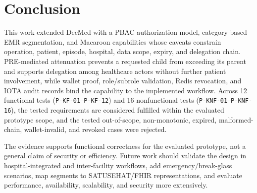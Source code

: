 \documentclass[conference,a4paper,english]{IEEEtran}
\begin{document}
\section{Conclusion}
\label{sec:conclusion}

This work extended DecMed with a PBAC authorization model, category-based EMR segmentation, and Macaroon capabilities whose caveats constrain operation, patient, episode, hospital, data scope, expiry, and delegation chain. PRE-mediated attenuation prevents a requested child from exceeding its parent and supports delegation among healthcare actors without further patient involvement, while wallet proof, role/subrole validation, Redis revocation, and IOTA audit records bind the capability to the implemented workflow. Across 12 functional tests (\texttt{P-KF-01}--\texttt{P-KF-12}) and 16 nonfunctional tests (\texttt{P-KNF-01}--\texttt{P-KNF-16}), the tested requirements are considered fulfilled within the evaluated prototype scope, and the tested out-of-scope, non-monotonic, expired, malformed-chain, wallet-invalid, and revoked cases were rejected.

The evidence supports functional correctness for the evaluated prototype, not a general claim of security or efficiency. Future work should validate the design in hospital-integrated and inter-facility workflows, add emergency/break-glass scenarios, map segments to SATUSEHAT/FHIR representations, and evaluate performance, availability, scalability, and security more extensively.
 
\printbibliography[title={References}]
\end{document}
